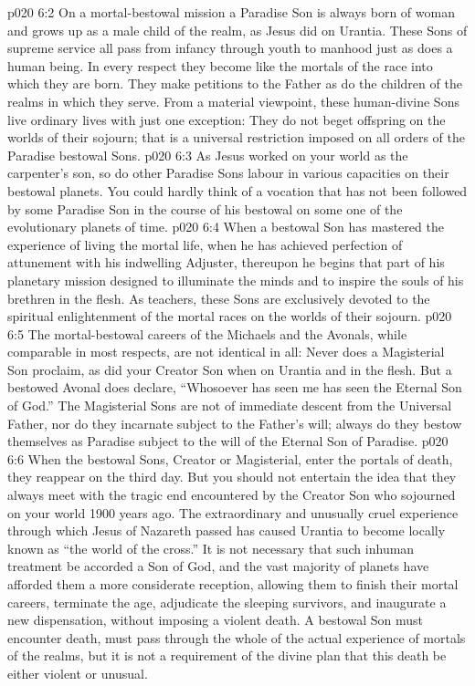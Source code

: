 \vs p020 6:2 \pc On a mortal\hyp{}bestowal mission a Paradise Son is always born of woman and grows up as a male child of the realm, as Jesus did on Urantia. These Sons of supreme service all pass from infancy through youth to manhood just as does a human being. In every respect they become like the mortals of the race into which they are born. They make petitions to the Father as do the children of the realms in which they serve. From a material viewpoint, these human\hyp{}divine Sons live ordinary lives with just one exception: They do not beget offspring on the worlds of their sojourn; that is a universal restriction imposed on all orders of the Paradise bestowal Sons.
\vs p020 6:3 As Jesus worked on your world as the carpenter’s son, so do other Paradise Sons labour in various capacities on their bestowal planets. You could hardly think of a vocation that has not been followed by some Paradise Son in the course of his bestowal on some one of the evolutionary planets of time.
\vs p020 6:4 When a bestowal Son has mastered the experience of living the mortal life, when he has achieved perfection of attunement with his indwelling Adjuster, thereupon he begins that part of his planetary mission designed to illuminate the minds and to inspire the souls of his brethren in the flesh. As teachers, these Sons are exclusively devoted to the spiritual enlightenment of the mortal races on the worlds of their sojourn.
\vs p020 6:5 \pc The mortal\hyp{}bestowal careers of the Michaels and the Avonals, while comparable in most respects, are not identical in all: Never does a Magisterial Son proclaim,  as did your Creator Son when on Urantia and in the flesh. But a bestowed Avonal does declare, “Whosoever has seen me has seen the Eternal Son of God.” The Magisterial Sons are not of immediate descent from the Universal Father, nor do they incarnate subject to the Father’s will; always do they bestow themselves as Paradise  subject to the will of the Eternal Son of Paradise.
\vs p020 6:6 \pc When the bestowal Sons, Creator or Magisterial, enter the portals of death, they reappear on the third day. But you should not entertain the idea that they always meet with the tragic end encountered by the Creator Son who sojourned on your world 1900 years ago. The extraordinary and unusually cruel experience through which Jesus of Nazareth passed has caused Urantia to become locally known as “the world of the cross.” It is not necessary that such inhuman treatment be accorded a Son of God, and the vast majority of planets have afforded them a more considerate reception, allowing them to finish their mortal careers, terminate the age, adjudicate the sleeping survivors, and inaugurate a new dispensation, without imposing a violent death. A bestowal Son must encounter death, must pass through the whole of the actual experience of mortals of the realms, but it is not a requirement of the divine plan that this death be either violent or unusual.
